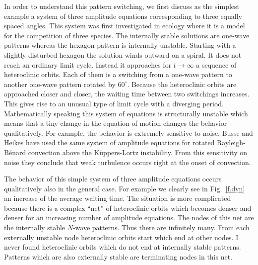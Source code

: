 In order to understand this pattern switching, we first discuss as
the simplest example a system of three amplitude equations 
corresponding to three equally spaced angles. This system was first
investigated in ecology where it is a model for the competition of
three species\cite{may.75}. The internally stable solutions are
one-wave patterns whereas the hexagon pattern is internally unstable.
Starting with a slightly disturbed hexagon the solution winds outward
on a spiral. It does not reach an ordinary limit cycle. Instead it
approaches for $t\to\infty$ a sequence of heteroclinic orbits. Each
of them is a switching from a one-wave pattern to another one-wave
pattern rotated by $60^\circ$. Because the heteroclinic orbits are
approached closer and closer, the waiting time between two switchings
increases. This gives rise to an unusual type of limit cycle with a
diverging period. Mathematically speaking this system of equations is
structurally unstable which means that a tiny change in the equation
of motion changes the behavior qualitatively. For example, the
behavior is extremely sensitive to noise. Busse and Heikes have used
the same system of amplitude equations for rotated Rayleigh-B\'enard
convection above the K\"uppers-Lortz instability\cite{bus.80}. From
this sensitivity on noise they conclude that weak turbulence occurs
right at the onset of convection.

The behavior of this simple system of three amplitude equations
occurs qualitatively also in the general case. For example we clearly
see in Fig.~\ref{f.dyn} an increase of the average waiting time. The
situation is more complicated because there is a complex ``net'' of
heteroclinic orbits which becomes denser and denser for an increasing
number of amplitude equations. The nodes of this net are the
internally stable $N$-wave patterns. Thus there are infinitely many.
From each externally unstable node heteroclinic orbits start which
end at other nodes. I never found heteroclinic orbits which do not
end at internally stable patterns.  Patterns which are also
externally stable are terminating nodes in this net. 

